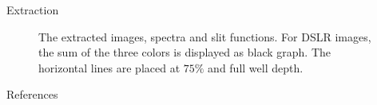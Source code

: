 \documentclass[final,t]{beamer}
\begin{document}
\begin{frame}
\begin{columns}[t]
\begin{column}{.32\linewidth}
\begin{block}{Extraction}
\begin{figure}
						\caption[spectra]%
						{The extracted images, spectra and slit functions. For DSLR images, the sum of the three colors is displayed as black graph. The horizontal lines are placed at $75\%$ and full well depth.}
						\label{fig:spectra}						
					\end{figure}
					
				\end{block}

				\begin{block}{References}
					
										
				\end{block}
			\end{column}
						
		\end{columns}
		
	\end{frame}
	
\end{document}
